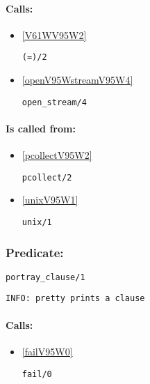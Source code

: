 \paragraph{Calls:} 
\begin{itemize}
\item \ref{V61WV95W2} 
\begin{verbatim}
(=)/2
\end{verbatim}

\item \ref{openV95WstreamV95W4} 
\begin{verbatim}
open_stream/4
\end{verbatim}

\end{itemize}
\paragraph{Is called from:} 
\begin{itemize}
\item \ref{pcollectV95W2} 
\begin{verbatim}
pcollect/2
\end{verbatim}

\item \ref{unixV95W1} 
\begin{verbatim}
unix/1
\end{verbatim}

\end{itemize}

\subsubsection{Predicate:} \label{portrayV95WclauseV95W1}

\begin{verbatim}
portray_clause/1
\end{verbatim}

{\small \begin{verbatim}
INFO: pretty prints a clause

\end{verbatim}}
\paragraph{Calls:} 
\begin{itemize}
\item \ref{failV95W0} 
\begin{verbatim}
fail/0
\end{verbatim}

\end{itemize}
